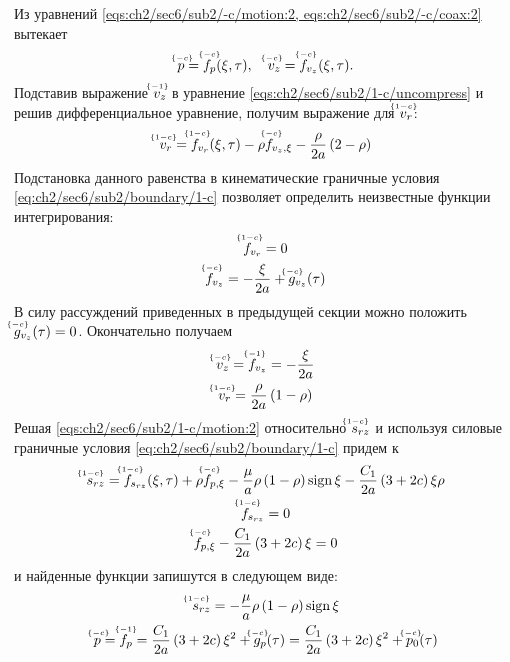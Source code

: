 Из уравнений \cref{eqs:ch2/sec6/sub2/-c/motion:2, eqs:ch2/sec6/sub2/-c/coax:2} вытекает
\begin{equation*}
  \uindex{p}{-c} = \uindex{f}{-c}_{p}(\xi, \tau), \quad \uindex{v}{-c}_{z} = \uindex{f}{-c}_{v_{z}}(\xi, \tau).
\end{equation*}
Подставив выражение $\uindex{v}{-1}_{z}$ в уравнение \cref{eqs:ch2/sec6/sub2/1-c/uncompress} и решив дифференциальное уравнение, получим выражение для $\uindex{v}{1-c}_{r}$:
\begin{equation*}
  \uindex{v}{1-c}_{r} = \uindex{f}{1-c}_{v_{r}}(\xi, \tau) -\rho \uindex{f}{-c}_{v_{z},\xi} - \frac{\rho}{2a}\left(2-\rho\right)
\end{equation*}
Подстановка данного равенства в кинематические граничные условия \cref{eq:ch2/sec6/sub2/boundary/1-c} позволяет определить неизвестные функции интегрирования:
\begin{gather*}
  \uindex{f}{1-c}_{v_{r}} = 0
  \\
  \uindex{f}{-c}_{v_{z}} = -\frac{\xi}{2a} + \uindex{g}{-c}_{v_{z}}(\tau)
\end{gather*}
В силу рассуждений приведенных в предыдущей секции можно положить $\uindex{g}{-c}_{v_{z}}(\tau) = 0$. Окончательно получаем
\begin{gather}
  \label{sol:ch2/sec6/sub2/vz/-c}
  \uindex{v}{-c}_{z} = \uindex{f}{-1}_{v_{z}} = -\frac{\xi}{2a}
  \\
  \label{sol:ch2/sec6/sub2/vr/1-c}
  \uindex{v}{1-c}_{r} =  \frac{\rho}{2a}\left(1-\rho\right)
\end{gather}
Решая \cref{eqs:ch2/sec6/sub2/1-c/motion:2} относительно $\uindex{s}{1-c}_{rz}$ и используя силовые граничные условия \cref{eq:ch2/sec6/sub2/boundary/1-c} придем к
\begin{gather*}
  \uindex{s}{1-c}_{rz} = \uindex{f}{1-c}_{s_{rz}}(\xi, \tau) + \rho \uindex{f}{-c}_{p,\xi} - \frac{\mu}{a} \rho\left(1-\rho\right)\sign\xi - \frac{C_1}{2a}\left(3+2c\right)\xi\rho
  \\
  \uindex{f}{1-c}_{s_{rz}} = 0
  \\
  \uindex{f}{-c}_{p,\xi} - \frac{C_1}{2a}\left(3+2c\right)\xi = 0
\end{gather*}
и найденные функции запишутся в следующем виде:
\begin{gather}
  \label{sol:ch2/sec6/sub2/srz/1-c}
  \uindex{s}{1-c}_{rz} = - \frac{\mu}{a} \rho\left(1-\rho\right)\sign\xi
  \\
  \label{sol:ch2/sec6/sub2/p/-c}
  \uindex{p}{-c}=\uindex{f}{-1}_{p} = \frac{C_1}{2a}\left(3+2c\right)\xi^2 + \uindex{g}{-c}_{p}(\tau) = \frac{C_1}{2a}\left(3+2c\right)\xi^2 + \uindex{p}{-c}_{0}(\tau)
\end{gather}
